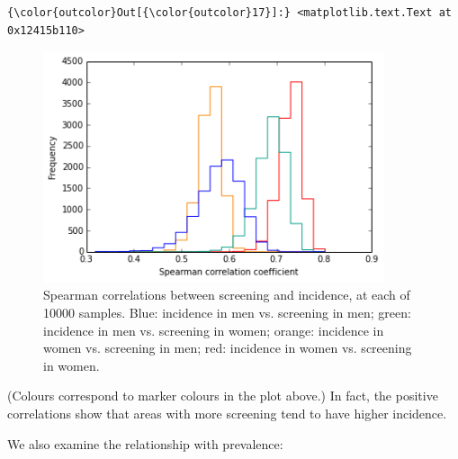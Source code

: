 \documentclass{article}
\begin{document}
    \begin{footnotesize}
            \begin{Verbatim}[commandchars=\\\{\}]
{\color{outcolor}Out[{\color{outcolor}17}]:} <matplotlib.text.Text at 0x12415b110>
\end{Verbatim}
    \end{footnotesize}
        
    \begin{figure}
        \begin{center}\includegraphics[width=10cm]{local_authorities_files/local_authorities_32_1.png}\end{center}
        \caption{Spearman correlations between screening and incidence, at each of 10000 samples. Blue: incidence in men vs. screening in men; green: incidence in men vs. screening in women; orange: incidence in women vs. screening in men; red: incidence in women vs. screening in women.}
        \label{}
    \end{figure}
    
    (Colours correspond to marker colours in the plot above.) In fact, the
positive correlations show that areas with more screening tend to have
higher incidence.

We also examine the relationship with prevalence:
\end{document}
